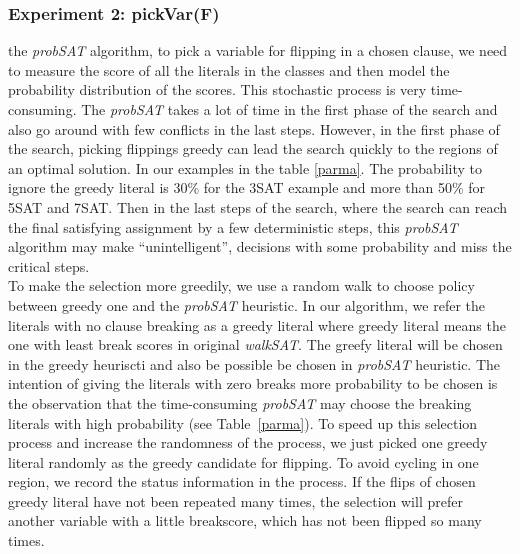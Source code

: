 \documentclass[12pt,a4paper,twoside]{scrartcl}
\numberwithin{equation}{section}
\begin{document}
\subsubsection{Experiment 2: pickVar(F)} 
\label{sec:Experiment 2} 
the \emph{probSAT} algorithm, to pick a variable for flipping in a chosen clause, we need to measure the score of all the literals in the classes and then model the probability distribution of the scores. This stochastic process is very time-consuming.  The \emph{probSAT} takes a lot of time in the first phase of the search and also go around with few conflicts in the last steps. However, in the first phase of the search, picking flippings greedy can lead the search quickly to the regions of an optimal solution. In our examples in the table \ref{parma}. The probability to ignore the greedy literal is 30\% for the 3SAT example and more than  50\% for 5SAT and 7SAT.  Then in the last steps of the search, where the search can reach the final satisfying assignment by a few deterministic steps, this \emph{probSAT} algorithm may make  ``unintelligent'', decisions with some probability and miss the critical steps. \\
To make the selection more greedily, we use a random walk to choose policy between greedy one and the \emph{probSAT} heuristic.  In our algorithm, we refer the literals with no clause breaking as a greedy literal where greedy literal means the one with least break scores in original \emph{walkSAT}. The greefy literal will be chosen in the greedy heuriscti and also be possible be chosen in \emph{probSAT} heuristic. The intention of giving the literals with zero breaks more probability to be chosen is the observation that the time-consuming \emph{probSAT} may choose the breaking literals with high probability (see Table~\ref{parma}).  To speed up this selection process and increase the randomness of the process, we just picked one greedy literal randomly as the greedy candidate for flipping.  To avoid cycling in one region, we record the status information in the process.  If the flips of chosen greedy literal have not been repeated many times, the selection will prefer another variable with a little breakscore, which has not been flipped so many times.  
\end{document}
